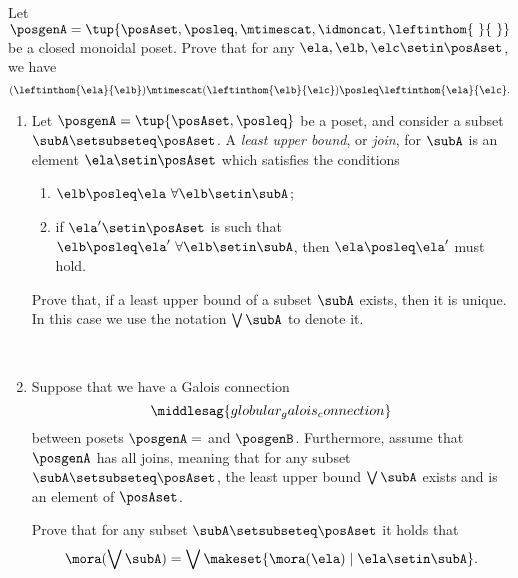 \begin{gradedexercise}
    \label{ex:HwkInternalHomCancelling}
    Let $\posgenA = \tup{\posAset, \posleq, \mtimescat, \idmoncat, \leftinthom{\ }{\ }}$ be a closed monoidal poset.
    Prove that for any $\ela, \elb, \elc \setin \posAset$, we have
    \begin{equation}
        (\leftinthom{\ela }{\elb }) \mtimescat (\leftinthom{\elb }{\elc }) \posleq \leftinthom{\ela }{\elc }.
    \end{equation}

\end{gradedexercise}


\begin{gradedexercise}
    \label{ex:HwkInternalLeastUpperBounds}

    \begin{enumerate}
        \item
              Let $\posgenA = \tup{\posAset, \posleq}$ be a poset, and consider a subset $\subA \setsubseteq \posAset$.
              A \emph{least upper bound}, or \emph{join}, for $\subA$ is an element $\ela \setin \posAset$ which satisfies the conditions
              \begin{enumerate}
                  \item $\elb \posleq \ela \ \forall \elb \setin \subA$;
                  \item if $\ela' \setin \posAset$ is such that $\elb \posleq \ela' \ \forall \elb \setin \subA$, then $\ela \posleq \ela'$ must hold.
              \end{enumerate}

              Prove that, if a least upper bound of a subset $\subA$ exists, then it is unique.
              In this case we use the notation $\bigvee \subA$ to denote it.

              \

        \item
              Suppose that we have a Galois connection
              \begin{equation}
                  \middlesag{globular_galois_connection}
              \end{equation}
              between posets $\posgenA = $ and $\posgenB$.
              Furthermore, assume that $\posgenA$ has all joins, meaning that for any subset $\subA \setsubseteq \posAset$, the least upper bound $\bigvee \subA$ exists and is an element of $\posAset$.

              Prove that for any subset $\subA \setsubseteq \posAset$ it holds that
              \begin{equation}
                  \mora (\bigvee \subA) = \bigvee \makeset{\mora(\ela) \mid \ela \setin \subA}.
              \end{equation}

    \end{enumerate}
\end{gradedexercise}

